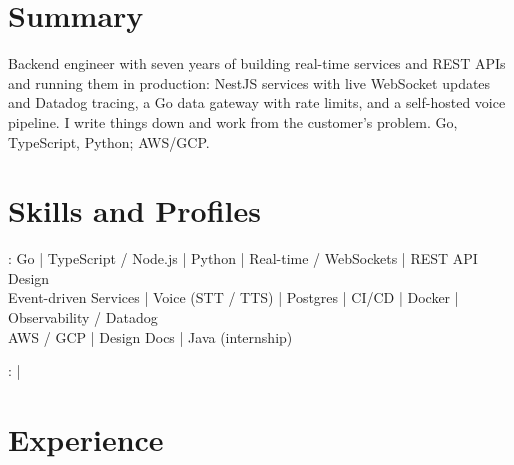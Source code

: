 \documentclass[print]{jack-resume}
\begin{document}
\pagecolor{darkmodeBackground}


\begin{minipage}[t][1cm][t]{.03\textwidth}
    \hfill
\end{minipage}

\section{Summary}
Backend engineer with seven years of building real-time services and REST APIs and running them in production: NestJS services with live WebSocket updates and Datadog tracing, a Go data gateway with rate limits, and a self-hosted voice pipeline. I write things down and work from the customer's problem. Go, TypeScript, Python; AWS/GCP.
\sectionsep

\section{Skills and Profiles}
:
Go \hfill | \hfill
TypeScript / Node.js \hfill | \hfill
Python \hfill | \hfill
Real-time / WebSockets \hfill | \hfill
REST API Design \\
\hspace{1.0cm} Event-driven Services \hfill | \hfill
Voice (STT / TTS) \hfill | \hfill
Postgres \hfill | \hfill
CI/CD \hfill | \hfill
Docker \hfill | \hfill
Observability / Datadog \\
\hspace{1.0cm} AWS / GCP \hfill | \hfill
Design Docs \hfill | \hfill
Java (internship) \\

\raggedright{
    :
      \href{https://www.linkedin.com/in/jack-sturtevant/}{ \ExternalLink} |
     \href{https://github.com/jacksturt}{ \ExternalLink}}

\section{Experience}
\end{document}
